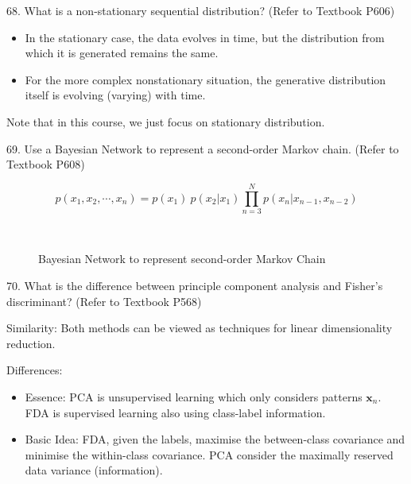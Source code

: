 \documentclass[11pt,a4paper]{article}
\newcommand{\bs}[1]{\boldsymbol{#1}}
\begin{document}
68. What is a non-stationary sequential distribution? (Refer to Textbook P606)

\begin{itemize}
     \item In the stationary case, the data evolves in time, but the distribution from which it is generated remains the same.
     \item For the more complex nonstationary situation, the generative distribution itself is evolving (varying) with time. 
    \end{itemize}
Note that in this course, we just focus on stationary distribution.

69. Use a Bayesian Network to represent a second-order Markov chain. (Refer to Textbook P608)

$$ p(x_1, x_2, \cdots, x_n) = p(x_1) \ p(x_2 | x_1) \prod_{n=3}^{N} p(x_n | x_{n-1}, x_{n-2}) $$
\begin{figure}[H] \centering
{}\\[0.5cm]
\caption{Bayesian Network to represent second-order Markov Chain}
\end{figure}

70. What is the difference between principle component analysis and Fisher's discriminant? (Refer to Textbook P568)

    Similarity: Both methods can be viewed as techniques for linear dimensionality reduction.
    
    Differences:
    \begin{itemize}
        \item Essence: PCA is unsupervised learning which only considers patterns $\bs{x}_n$. FDA is supervised learning also using class-label information.
    \item Basic Idea: FDA, given the labels, maximise the between-class covariance and minimise the within-class covariance. PCA consider the maximally reserved data variance (information).
     \end{itemize}
\end{document}
